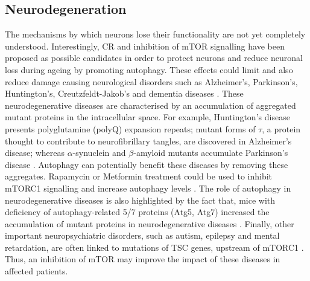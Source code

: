 \subsection{Neurodegeneration}
\label{subsec:Neurodegeneration}
The mechanisms by which neurons lose their functionality are not yet completely understood. Interestingly, CR and inhibition of mTOR signalling have been proposed as possible candidates in order to protect neurons and reduce neuronal loss during ageing by promoting autophagy. These effects could limit and also reduce damage causing neurological disorders such as Alzheimer's, Parkinson's, Huntington's, Creutzfeldt-Jakob's and dementia diseases \citep{Rosner2008}. These neurodegenerative diseases are characterised by an accumulation of aggregated mutant proteins in the intracellular space. For example, Huntington's disease presents polyglutamine (polyQ) expansion repeats; mutant forms of $\tau$, a protein thought to contribute to neurofibrillary tangles, are discovered in Alzheimer's disease; whereas $\alpha$-synuclein and $\beta$-amyloid mutants accumulate Parkinson's disease \citep{Levine2008, Glick2010}. Autophagy can potentially benefit these diseases by removing these aggregates. Rapamycin or Metformin 
treatment could be used to inhibit mTORC1 signalling and increase autophagy levels \citep{Hara2006, Komatsu2006}. The role of autophagy in neurodegenerative diseases is also highlighted by the fact that, mice with deficiency of autophagy-related 5/7 proteins (Atg5, Atg7) increased the accumulation of mutant proteins in neurodegenerative diseases \citep{Hara2006, Komatsu2006}. Finally, other important neuropsychiatric disorders, such as autism, epilepsy and mental retardation, are often linked to mutations of TSC genes, upstream of mTORC1 \citep{Gomez1999, Tee2002}. Thus, an inhibition of mTOR may improve the impact of these diseases in affected patients.

